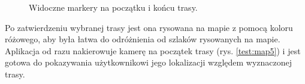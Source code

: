 \setlength{\fboxrule}{0.5pt}
\begin{figure}[H]
    \centering
    \caption{Widoczne markery na początku i końcu trasy.}
    \label{test:map4}
\end{figure}

Po zatwierdzeniu wybranej trasy jest ona rysowana na mapie z pomocą koloru różowego, aby była łatwa do odróżnienia od szlaków rysowanych na mapie. Aplikacja od razu nakierowuje kamerę na początek trasy (rys. \ref{test:map5}) i jest gotowa do pokazywania użytkownikowi jego lokalizacji względem wyznaczonej trasy.

